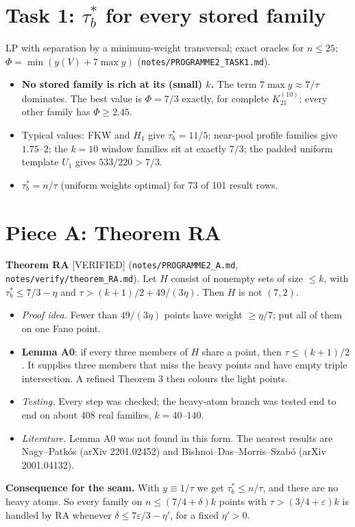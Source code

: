 \documentclass[11pt]{article}
\newcommand{\lvl}[1]{\textsf{\small[#1]}}
\begin{document}
\section{Task 1: $\tau^*_b$ for every stored family}
LP with separation by a minimum-weight transversal; exact oracles for $n\le25$; $\Phi=\min(y(V)+7\max y)$
(\texttt{notes/PROGRAMME2\_TASK1.md}).
\begin{itemize}
\item \textbf{No stored family is rich at its (small) $k$.} The term $7\max y\approx7/\tau$ dominates. The best value is
$\Phi=7/3$ exactly, for complete $K_{21}^{(10)}$; every other family has $\Phi\ge2.45$.
\item Typical values: FKW and $H_1$ give $\tau^*_b=11/5$; near-pool profile families give $1.75$--$2$; the $k=10$ window
families sit at exactly $7/3$; the padded uniform template $U_1$ gives $533/220>7/3$.
\item $\tau^*_b=n/\tau$ (uniform weights optimal) for 73 of 101 result rows.
\end{itemize}

\section{Piece A: Theorem RA}
\textbf{Theorem RA} \lvl{VERIFIED} (\texttt{notes/PROGRAMME2\_A.md}, \texttt{notes/verify/theorem\_RA.md}). Let $H$
consist of nonempty sets of size $\le k$, with $\tau^*_b\le7/3-\eta$ and $\tau>(k+1)/2+49/(3\eta)$. Then $H$ is not
$(7,2)$.
\begin{itemize}
\item \emph{Proof idea.} Fewer than $49/(3\eta)$ points have weight $\ge\eta/7$; put all of them on one Fano point.
\item \textbf{Lemma A0}: if every three members of $H$ share a point, then $\tau\le(k+1)/2$. It supplies three members
that miss the heavy points and have empty triple intersection. A refined Theorem 3 then colours the light points.
\item \emph{Testing.} Every step was checked; the heavy-atom branch was tested end to end on about 408 real families,
$k=40$--$140$.
\item \emph{Literature.} Lemma A0 was not found in this form. The nearest results are Nagy--Patk\'os (arXiv 2201.02452)
and Bishnoi--Das--Morris--Szab\'o (arXiv 2001.04132).
\end{itemize}
\textbf{Consequence for the seam.} With $y\equiv1/\tau$ we get $\tau^*_b\le n/\tau$, and there are no heavy atoms. So
every family on $n\le(7/4+\delta)k$ points with $\tau>(3/4+\varepsilon)k$ is handled by RA whenever
$\delta\le7\varepsilon/3-\eta'$, for a fixed $\eta'>0$.
\end{document}
